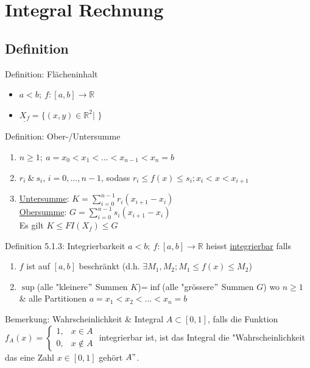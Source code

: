 \documentclass[a4paper,10pt]{article}
\begin{document}
\section{Integral Rechnung}
\subsection{Definition}
\begin{defbox}
    {Definition: Flächeninhalt}
    \begin{itemize}
        \item $a<b;\ f:[a,b]\longrightarrow \mathbb R$
        \item  $\underline{X_f}=\bigg\{(x,y)\in \mathbb R^2\big|$
        $\bigg \} $
    \end{itemize}
\end{defbox}
\begin{defbox}
    {Definition: Ober-/Untersumme}
    \begin{enumerate}
        \item $n\ge 1; \ a=x_0<x_1<...<x_{n-1}<x_n=b$
        \item $r_i \ \& \ s_i$, $i=0,...,n-1$, sodass $r_i\le f(x)\le s_i; x_i<x<x_{i+1}$
        \item \underline{Untersumme}: $K=\sum_{i=0}^{n-1}r_i(x_{i+1}-x_i)$
        \\ \underline{Obersumme}: $G=\sum_{i=0}^{n-1}s_i(x_{i+1}-x_i)$
        \\ Es gilt $K\le FI(X_f)\le G$
    \end{enumerate}
\end{defbox}
\begin{defbox}
    {Definition 5.1.3: Integrierbarkeit}
    $a<b;\ f:[a,b]\longrightarrow \mathbb R$ heisst \underline{integrierbar} falls
    \begin{enumerate}
        \item $f$ ist auf $[a,b]$ beschränkt (d.h. $\exists M_1, M_2; M_1\le f(x)\le M_2$)
        \item  $\sup$(alle "kleinere$"$ Summen $K$)=$\inf$(alle "grössere$"$ Summen $G$) wo $n\ge 1$ \& alle Partitionen $a=x_1<x_2<...<x_n=b$
    \end{enumerate}
\end{defbox}
\begin{bembox}
    {Bemerkung: Wahrscheinlichkeit \& Integral}
    $A\subset [0,1]$, falls die Funktion $f_A(x)=
    \begin{cases}
        1, & x\in A
        \\ 0, & x\notin A
    \end{cases}$
    integrierbar ist, ist das Integral die "Wahrscheinlichkeit das eine Zahl $x\in[0,1]$ gehört $A"$.
\end{bembox}
\end{document}
